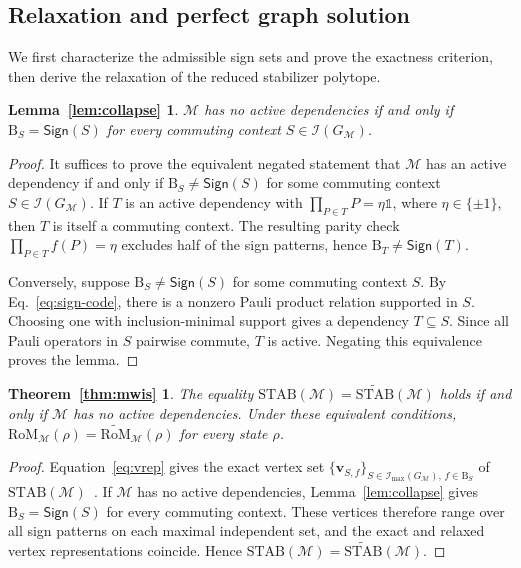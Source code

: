 \documentclass[10pt,aps,pra,twocolumn,floatfix,nofootinbib,superscriptaddress,longbibliography]{revtex4-2}
\newcommand{\Mcal}{\mathcal M}
\newcommand{\STAB}{\mathrm{STAB}}
\newcommand{\RoM}{\mathrm{RoM}}
\newcommand{\Ind}{\mathcal I}
\newcommand{\Bset}{\mathrm B}
\providecommand{\mathbm}[1]{\bm{#1}}
\newtheorem*{lemmaCollapseRestatement}{Lemma~\ref{lem:collapse}}
\newtheorem*{theoremMwisRestatement}{Theorem~\ref{thm:mwis}}
\begin{document}
\begin{bibunit}[apsrev4-2]
		\section{Relaxation and perfect graph solution}
		\label{app:proof-mwis}
		
		
		We first characterize the admissible sign sets and prove the exactness criterion, then derive the relaxation of the reduced stabilizer polytope.
		
		\begin{lemmaCollapseRestatement}
			
			$\Mcal$ has no active dependencies if and only if $\Bset_S=\mathsf{Sign}(S)$ for every commuting context $S\in\Ind(G_\Mcal)$.
		\end{lemmaCollapseRestatement}
		
		\begin{proof}
			It suffices to prove the equivalent negated statement that
			$\Mcal$ has an active dependency if and only if
			$\Bset_S\neq\mathsf{Sign}(S)$ for some commuting context
			$S\in\Ind(G_\Mcal)$. If $T$ is an active dependency with
			$\prod_{P\in T}P=\eta\mathbb{1}$, where $\eta\in\{\pm1\}$,
			then $T$ is itself a commuting context.
			The resulting parity check
			$\prod_{P\in T}f(P)=\eta$ excludes half of the sign patterns,
			hence $\Bset_T\neq\mathsf{Sign}(T)$.
			
			Conversely, suppose
			$\Bset_S\neq\mathsf{Sign}(S)$ for some commuting context $S$.
			By Eq.~\eqref{eq:sign-code}, there is a nonzero Pauli product
			relation supported in $S$.
			Choosing one with inclusion-minimal support gives a dependency
			$T\subseteq S$.
			Since all Pauli operators in $S$ pairwise commute, $T$ is active.
			Negating this equivalence proves the lemma.
		\end{proof}
		
		\begin{theoremMwisRestatement}
			
			The equality $\STAB(\Mcal)=\widetilde{\STAB}(\Mcal)$ holds if and only if $\Mcal$ has no active dependencies.
			Under these equivalent conditions, $\RoM_\Mcal(\rho)=\widetilde{\RoM}_\Mcal(\rho)$ for every state $\rho$.
		\end{theoremMwisRestatement}
		
		\begin{proof}
			Equation~\eqref{eq:vrep} gives the exact vertex set $\{\mathbm{v}_{S,f}\}_{S\in\Ind_{\max}(G_\Mcal),\,f\in\Bset_S}$ of $\STAB(\Mcal)$~\cite{varela2026predictingmagicmeasurements}. If $\Mcal$ has no active dependencies, Lemma~\ref{lem:collapse} gives $\Bset_S=\mathsf{Sign}(S)$ for every commuting context. These vertices therefore range over all sign patterns on each maximal independent set, and the exact and relaxed vertex representations coincide.
			Hence $\STAB(\Mcal)=\widetilde{\STAB}(\Mcal)$.
			

\end{proof}
\end{bibunit}
\end{document}
